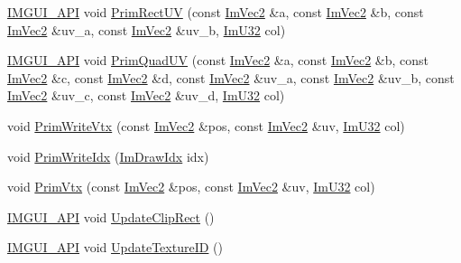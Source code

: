 \begin{DoxyCompactItemize}
\item 
\mbox{\hyperlink{imgui_8h_a43829975e84e45d1149597467a14bbf5}{I\+M\+G\+U\+I\+\_\+\+A\+PI}} void \mbox{\hyperlink{struct_im_draw_list_a77d48ed5b33ccdd908824c0a3bebfff8}{Prim\+Rect\+UV}} (const \mbox{\hyperlink{struct_im_vec2}{Im\+Vec2}} \&a, const \mbox{\hyperlink{struct_im_vec2}{Im\+Vec2}} \&b, const \mbox{\hyperlink{struct_im_vec2}{Im\+Vec2}} \&uv\+\_\+a, const \mbox{\hyperlink{struct_im_vec2}{Im\+Vec2}} \&uv\+\_\+b, \mbox{\hyperlink{imgui_8h_a118cff4eeb8d00e7d07ce3d6460eed36}{Im\+U32}} col)
\item 
\mbox{\hyperlink{imgui_8h_a43829975e84e45d1149597467a14bbf5}{I\+M\+G\+U\+I\+\_\+\+A\+PI}} void \mbox{\hyperlink{struct_im_draw_list_a9df27414aaca5f34ac3664a8b82582b5}{Prim\+Quad\+UV}} (const \mbox{\hyperlink{struct_im_vec2}{Im\+Vec2}} \&a, const \mbox{\hyperlink{struct_im_vec2}{Im\+Vec2}} \&b, const \mbox{\hyperlink{struct_im_vec2}{Im\+Vec2}} \&c, const \mbox{\hyperlink{struct_im_vec2}{Im\+Vec2}} \&d, const \mbox{\hyperlink{struct_im_vec2}{Im\+Vec2}} \&uv\+\_\+a, const \mbox{\hyperlink{struct_im_vec2}{Im\+Vec2}} \&uv\+\_\+b, const \mbox{\hyperlink{struct_im_vec2}{Im\+Vec2}} \&uv\+\_\+c, const \mbox{\hyperlink{struct_im_vec2}{Im\+Vec2}} \&uv\+\_\+d, \mbox{\hyperlink{imgui_8h_a118cff4eeb8d00e7d07ce3d6460eed36}{Im\+U32}} col)
\item 
void \mbox{\hyperlink{struct_im_draw_list_af86de4faf6c8e978fb712ea14c5d0c5f}{Prim\+Write\+Vtx}} (const \mbox{\hyperlink{struct_im_vec2}{Im\+Vec2}} \&pos, const \mbox{\hyperlink{struct_im_vec2}{Im\+Vec2}} \&uv, \mbox{\hyperlink{imgui_8h_a118cff4eeb8d00e7d07ce3d6460eed36}{Im\+U32}} col)
\item 
void \mbox{\hyperlink{struct_im_draw_list_a42b72f87a0084c02f11dcd1560c8bbc7}{Prim\+Write\+Idx}} (\mbox{\hyperlink{imgui_8h_afdc8744a5ac1a968b1ddfa47e13b2fa1}{Im\+Draw\+Idx}} idx)
\item 
void \mbox{\hyperlink{struct_im_draw_list_a405377158f0028ad8b4fb6509eef4532}{Prim\+Vtx}} (const \mbox{\hyperlink{struct_im_vec2}{Im\+Vec2}} \&pos, const \mbox{\hyperlink{struct_im_vec2}{Im\+Vec2}} \&uv, \mbox{\hyperlink{imgui_8h_a118cff4eeb8d00e7d07ce3d6460eed36}{Im\+U32}} col)
\item 
\mbox{\hyperlink{imgui_8h_a43829975e84e45d1149597467a14bbf5}{I\+M\+G\+U\+I\+\_\+\+A\+PI}} void \mbox{\hyperlink{struct_im_draw_list_a5978db1fc49be781978699e85c6a3251}{Update\+Clip\+Rect}} ()
\item 
\mbox{\hyperlink{imgui_8h_a43829975e84e45d1149597467a14bbf5}{I\+M\+G\+U\+I\+\_\+\+A\+PI}} void \mbox{\hyperlink{struct_im_draw_list_a58998853ed37538ae5a638da032b0005}{Update\+Texture\+ID}} ()
\end{DoxyCompactItemize}
